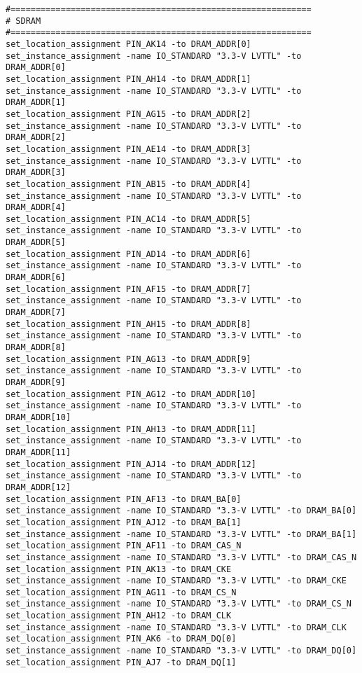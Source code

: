 \documentclass[dvipdfm]{book}
\begin{document}
\begin{verbatim}
#============================================================
# SDRAM
#============================================================
set_location_assignment PIN_AK14 -to DRAM_ADDR[0]
set_instance_assignment -name IO_STANDARD "3.3-V LVTTL" -to DRAM_ADDR[0]
set_location_assignment PIN_AH14 -to DRAM_ADDR[1]
set_instance_assignment -name IO_STANDARD "3.3-V LVTTL" -to DRAM_ADDR[1]
set_location_assignment PIN_AG15 -to DRAM_ADDR[2]
set_instance_assignment -name IO_STANDARD "3.3-V LVTTL" -to DRAM_ADDR[2]
set_location_assignment PIN_AE14 -to DRAM_ADDR[3]
set_instance_assignment -name IO_STANDARD "3.3-V LVTTL" -to DRAM_ADDR[3]
set_location_assignment PIN_AB15 -to DRAM_ADDR[4]
set_instance_assignment -name IO_STANDARD "3.3-V LVTTL" -to DRAM_ADDR[4]
set_location_assignment PIN_AC14 -to DRAM_ADDR[5]
set_instance_assignment -name IO_STANDARD "3.3-V LVTTL" -to DRAM_ADDR[5]
set_location_assignment PIN_AD14 -to DRAM_ADDR[6]
set_instance_assignment -name IO_STANDARD "3.3-V LVTTL" -to DRAM_ADDR[6]
set_location_assignment PIN_AF15 -to DRAM_ADDR[7]
set_instance_assignment -name IO_STANDARD "3.3-V LVTTL" -to DRAM_ADDR[7]
set_location_assignment PIN_AH15 -to DRAM_ADDR[8]
set_instance_assignment -name IO_STANDARD "3.3-V LVTTL" -to DRAM_ADDR[8]
set_location_assignment PIN_AG13 -to DRAM_ADDR[9]
set_instance_assignment -name IO_STANDARD "3.3-V LVTTL" -to DRAM_ADDR[9]
set_location_assignment PIN_AG12 -to DRAM_ADDR[10]
set_instance_assignment -name IO_STANDARD "3.3-V LVTTL" -to DRAM_ADDR[10]
set_location_assignment PIN_AH13 -to DRAM_ADDR[11]
set_instance_assignment -name IO_STANDARD "3.3-V LVTTL" -to DRAM_ADDR[11]
set_location_assignment PIN_AJ14 -to DRAM_ADDR[12]
set_instance_assignment -name IO_STANDARD "3.3-V LVTTL" -to DRAM_ADDR[12]
set_location_assignment PIN_AF13 -to DRAM_BA[0]
set_instance_assignment -name IO_STANDARD "3.3-V LVTTL" -to DRAM_BA[0]
set_location_assignment PIN_AJ12 -to DRAM_BA[1]
set_instance_assignment -name IO_STANDARD "3.3-V LVTTL" -to DRAM_BA[1]
set_location_assignment PIN_AF11 -to DRAM_CAS_N
set_instance_assignment -name IO_STANDARD "3.3-V LVTTL" -to DRAM_CAS_N
set_location_assignment PIN_AK13 -to DRAM_CKE
set_instance_assignment -name IO_STANDARD "3.3-V LVTTL" -to DRAM_CKE
set_location_assignment PIN_AG11 -to DRAM_CS_N
set_instance_assignment -name IO_STANDARD "3.3-V LVTTL" -to DRAM_CS_N
set_location_assignment PIN_AH12 -to DRAM_CLK
set_instance_assignment -name IO_STANDARD "3.3-V LVTTL" -to DRAM_CLK
set_location_assignment PIN_AK6 -to DRAM_DQ[0]
set_instance_assignment -name IO_STANDARD "3.3-V LVTTL" -to DRAM_DQ[0]
set_location_assignment PIN_AJ7 -to DRAM_DQ[1]

\end{verbatim}
\end{document}
